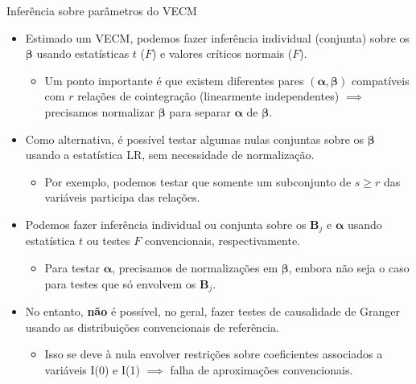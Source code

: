 \documentclass[11pt]{beamer}
\begin{document}
\begin{frame}{Inferência sobre parâmetros do VECM}
\begin{itemize}
	\item Estimado um VECM, podemos fazer inferência individual (conjunta) sobre  os $\boldsymbol{\beta}$ usando estatísticas $t$ ($F$) e valores críticos normais ($F$).
	\begin{itemize}
		\item Um ponto importante é que existem diferentes pares $(\boldsymbol{\alpha},\boldsymbol{\beta})$ compatíveis com $r$ relações de cointegração (linearmente independentes) $\implies$ precisamos normalizar $\boldsymbol{\beta}$ para separar $\boldsymbol{\alpha}$ de $\boldsymbol{\beta}$.
	\end{itemize}
	\item Como alternativa, é possível testar algumas nulas conjuntas sobre os $\boldsymbol{\beta}$ usando a estatística LR, sem necessidade de normalização.
\begin{itemize}
	\item Por exemplo, podemos testar que somente um subconjunto de $s \geq r$ das variáveis  participa das relações.
\end{itemize}
\item Podemos fazer inferência individual ou conjunta sobre os $\boldsymbol{B}_j$ e $\boldsymbol{\alpha}$ usando estatística $t$ ou testes $F$ convencionais, respectivamente.
\begin{itemize}
	\item Para testar $\boldsymbol{\alpha}$, precisamos de normalizações em $\boldsymbol{\beta}$, embora não seja o caso para testes que só envolvem os  $\boldsymbol{B}_j$.
\end{itemize}
	\item No entanto, \textbf{não} é possível, no geral, fazer testes de causalidade de Granger usando as distribuições convencionais de referência.
	\begin{itemize}
		\item Isso se deve à nula envolver restrições sobre coeficientes associados a variáveis I(0) e I(1) $\implies$ falha de aproximações convencionais.
	\end{itemize}
\end{itemize}
\end{frame}
\end{document}
